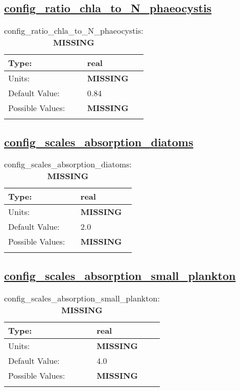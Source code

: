 \subsection[config\_ratio\_chla\_to\_N\_phaeocystis]{\hyperref[sec:nm_tab_biogeochemistry]{config\_ratio\_chla\_to\_N\_phaeocystis}}
\label{subsec:nm_sec_config_ratio_chla_to_N_phaeocystis}
\begin{center}
\begin{longtable}{| p{2.0in} || p{4.0in} |}
    \hline
    Type: & real \\
    \hline
    Units: & {\bf \color{red} MISSING} \\
    \hline
    Default Value: & 0.84 \\
    \hline
    Possible Values: & {\bf \color{red} MISSING} \\
    \hline
    \caption{config\_ratio\_chla\_to\_N\_phaeocystis: {\bf \color{red} MISSING}}
\end{longtable}
\end{center}
\subsection[config\_scales\_absorption\_diatoms]{\hyperref[sec:nm_tab_biogeochemistry]{config\_scales\_absorption\_diatoms}}
\label{subsec:nm_sec_config_scales_absorption_diatoms}
\begin{center}
\begin{longtable}{| p{2.0in} || p{4.0in} |}
    \hline
    Type: & real \\
    \hline
    Units: & {\bf \color{red} MISSING} \\
    \hline
    Default Value: & 2.0 \\
    \hline
    Possible Values: & {\bf \color{red} MISSING} \\
    \hline
    \caption{config\_scales\_absorption\_diatoms: {\bf \color{red} MISSING}}
\end{longtable}
\end{center}
\subsection[config\_scales\_absorption\_small\_plankton]{\hyperref[sec:nm_tab_biogeochemistry]{config\_scales\_absorption\_small\_plankton}}
\label{subsec:nm_sec_config_scales_absorption_small_plankton}
\begin{center}
\begin{longtable}{| p{2.0in} || p{4.0in} |}
    \hline
    Type: & real \\
    \hline
    Units: & {\bf \color{red} MISSING} \\
    \hline
    Default Value: & 4.0 \\
    \hline
    Possible Values: & {\bf \color{red} MISSING} \\
    \hline
    \caption{config\_scales\_absorption\_small\_plankton: {\bf \color{red} MISSING}}
\end{longtable}
\end{center}
